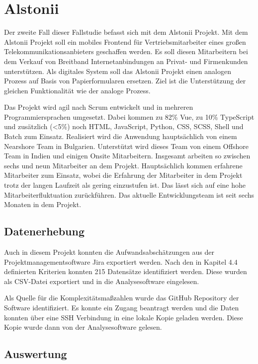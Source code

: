 \section{Alstonii}\label{alstonii}

Der zweite Fall dieser Fallstudie befasst sich mit dem Alstonii
Projekt. Mit dem Alstonii Projekt soll ein mobiles Frontend für
Vertriebsmitarbeiter eines gro\ss en Telekommunikationsanbieters geschaffen
werden. Es soll diesen Mitarbeitern bei dem Verkauf von Breitband
Internetanbindungen an Privat- und Firmenkunden unterstützen. Als
digitales System soll das Alstonii Projekt einen analogen Prozess auf Basis
von Papierformularen ersetzen. Ziel ist die Unterstützung der gleichen
Funktionalität wie der analoge Prozess.

Das Projekt wird agil nach Scrum entwickelt und in mehreren
Programmiersprachen umgesetzt. Dabei kommen zu 82\% Vue, zu 10\%
TypeScript und zusätzlich (\textless5\%) noch \ac{HTML}, JavaScript, Python,
CSS, SCSS, Shell und Batch zum Einsatz. Realisiert
wird die Anwendung hauptsächlich von einem Nearshore Team in Bulgarien.
Unterstützt wird dieses Team von einem Offshore Team in Indien und
einigen Onsite Mitarbeitern. Insgesamt arbeiten so zwischen sechs und
neun Mitarbeiter an dem Projekt. Hauptsächlich kommen erfahrene
Mitarbeiter zum Einsatz, wobei die Erfahrung der Mitarbeiter in dem
Projekt trotz der langen Laufzeit als gering einzustufen ist. Das lässt
sich auf eine hohe Mitarbeiterfluktuation zurückführen. Das aktuelle
Entwicklungsteam ist seit sechs Monaten in dem Projekt.

\subsection{Datenerhebung}\label{Alstonii-Datenerhebung}

Auch in diesem Projekt konnten die Aufwandsabschätzungen aus der
Projektmanagementsoftware Jira exportiert werden. Nach den in Kapitel
4.4 definierten Kriterien konnten 215 Datensätze identifiziert werden.
Diese wurden als CSV-Datei exportiert und in die Analysesoftware
eingelesen.

Als Quelle für die Komplexitätsma\ss zahlen wurde das GitHub Repository der
Software identifiziert. Es konnte ein Zugang beantragt werden und die
Daten konnten über eine \ac{SSH} Verbindung in eine lokale Kopie geladen
werden. Diese Kopie wurde dann von der Analysesoftware gelesen.

\subsection{Auswertung}\label{Alstonii-Auswertung}

